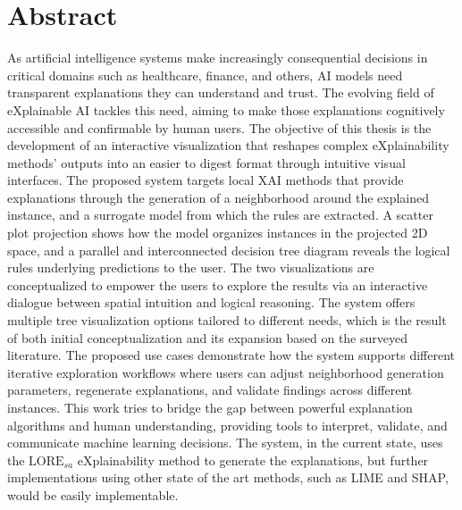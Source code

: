 \chapter*{Abstract}

As artificial intelligence systems make increasingly consequential decisions in critical domains such as healthcare, finance, and others, AI models need transparent explanations they can understand and trust. The evolving field of eXplainable AI tackles this need, aiming to make those explanations cognitively accessible and confirmable by human users. The objective of this thesis is the development of an interactive visualization that reshapes complex eXplainability methods' outputs into an easier to digest format through intuitive visual interfaces. The proposed system targets local XAI methods that provide explanations through the generation of a neighborhood around the explained instance, and a surrogate model from which the rules are extracted. A scatter plot projection shows how the model organizes instances in the projected 2D space, and a parallel and interconnected decision tree diagram reveals the logical rules underlying predictions to the user. The two visualizations are conceptualized to empower the users to explore the results via an interactive dialogue between spatial intuition and logical reasoning. The system offers multiple tree visualization options tailored to different needs, which is the result of both initial conceptualization and its expansion based on the surveyed literature. The proposed use cases demonstrate how the system supports different iterative exploration workflows where users can adjust neighborhood generation parameters, regenerate explanations, and validate findings across different instances. This work tries to bridge the gap between powerful explanation algorithms and human understanding, providing tools to interpret, validate, and communicate machine learning decisions. The system, in the current state, uses the $\text{LORE}_{sa}$ eXplainability method to generate the explanations, but further implementations using other state of the art methods, such as LIME and SHAP, would be easily implementable.